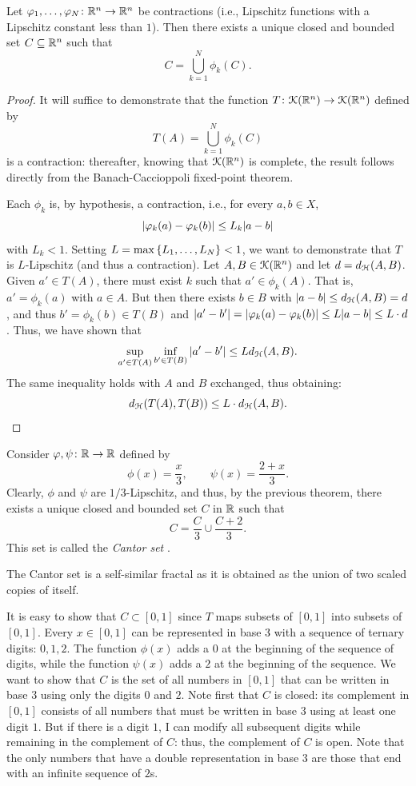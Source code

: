 \begin{theorem}
Let $\varphi_1, \dots, \varphi_N \colon {\mathbb R}^n \to {\mathbb R}^n$ be contractions (i.e.,
Lipschitz functions with a Lipschitz constant less than $1$). Then there exists
a unique closed and bounded set $C\subseteq {\mathbb R}^n$ such that
\[
  C = \bigcup_{k=1}^N \phi_k(C).
\]
\end{theorem}
%
\begin{proof}
It will suffice to demonstrate that the function $T\colon \mathcal K({\mathbb R}^n)\to
\mathcal K({\mathbb R}^n)$ defined by
\[
  T(A) = \bigcup_{k=1}^N \phi_k(C)
\]
is a contraction: thereafter, knowing that $\mathcal K({\mathbb R}^n)$ is complete, the result
follows directly from the Banach-Caccioppoli fixed-point theorem.

Each $\phi_k$ is, by hypothesis, a contraction, i.e., for every $a,b\in X$,
\[
  {\left|\varphi_k(a)-\varphi_k(b)\right|} \le L_k {\left|a-b\right|}
\]
with $L_k< 1$. Setting $L=\max {\left\{ L_1, \dots, L_N \right\}} < 1$, we want to
demonstrate that $T$ is $L$-Lipschitz (and thus a contraction). Let $A,B \in
\mathcal K({\mathbb R}^n)$ and let $d = d_\mathcal H(A,B)$. Given $a' \in T(A)$, there must exist $k$
such that $a' \in \phi_k(A)$. That is, $a'= \phi_k(a)$ with $a\in A$. But then
there exists $b\in B$ with ${\left|a-b\right|}\le d_\mathcal H(A,B) = d$, and thus $b'=\phi_k(b)
\in T(B)$ and ${\left|a'-b'\right|} = {\left|\varphi_k(a)-\varphi_k(b)\right|} \le L {\left|a-b\right|} \le L
\cdot d$. Thus, we have shown that
\[
  \sup_{a' \in T(A)} \inf_{b'\in T(B)} {\left|a'-b'\right|} \le L d_\mathcal H(A,B).
\]
The same inequality holds with $A$ and $B$ exchanged, thus obtaining:
\[
  d_\mathcal H(T(A),T(B)) \le L\cdot d_\mathcal H(A,B).
\]
\end{proof}

\begin{example}
  \label{ex:insieme_Cantor}%
Consider $\varphi, \psi\colon {\mathbb R} \to {\mathbb R}$ defined by
\[
  \phi(x) = \frac{x}{3}, \qquad
  \psi(x) = \frac{2+x}{3}.
\]
Clearly, $\phi$ and $\psi$ are $1/3$-Lipschitz, and thus, by the previous
theorem, there exists a unique closed and bounded set $C$ in ${\mathbb R}$ such that
\[
  C = \frac{C}{3} \cup \frac{C+2}{3}.
\]
This set is called the \emph{Cantor set}%
.

The Cantor set is a self-similar fractal as it is obtained as the union of two
scaled copies of itself.

It is easy to show that $C\subset [0,1]$ since $T$ maps subsets of $[0,1]$ into
subsets of $[0,1]$. Every $x\in [0,1]$ can be represented in base $3$ with a
sequence of ternary digits: $0,1,2$. The function $\phi(x)$ adds a $0$ at the
beginning of the sequence of digits, while the function $\psi(x)$ adds a $2$ at
the beginning of the sequence. We want to show that $C$ is the set of all
numbers in $[0,1]$ that can be written in base $3$ using only the digits $0$ and
$2$. Note first that $C$ is closed: its complement in $[0,1]$ consists of all
numbers that must be written in base $3$ using at least one digit $1$. But if
there is a digit $1$, I can modify all subsequent digits while remaining in the
complement of $C$: thus, the complement of $C$ is open. Note that the only
numbers that have a double representation in base $3$ are those that end with an
infinite sequence of $2$s.
\end{example}

